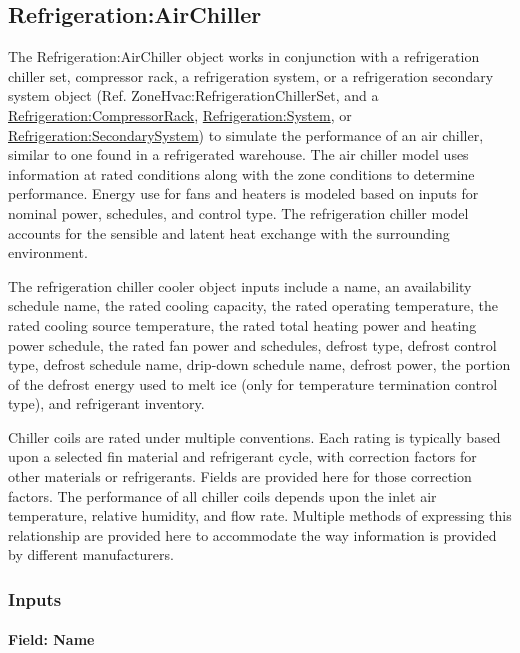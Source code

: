 \subsection{Refrigeration:AirChiller}\label{refrigerationairchiller}

The Refrigeration:AirChiller object works in conjunction with a refrigeration chiller set, compressor rack, a refrigeration system, or a refrigeration secondary system object (Ref. ZoneHvac:RefrigerationChillerSet, and a \hyperref[refrigerationcompressorrack]{Refrigeration:CompressorRack}, \hyperref[refrigerationsystem]{Refrigeration:System}, or \hyperref[refrigerationsecondarysystem]{Refrigeration:SecondarySystem}) to simulate the performance of an air chiller, similar to one found in a refrigerated warehouse. The air chiller model uses information at rated conditions along with the zone conditions to determine performance. Energy use for fans and heaters is modeled based on inputs for nominal power, schedules, and control type. The refrigeration chiller model accounts for the sensible and latent heat exchange with the surrounding environment.

The refrigeration chiller cooler object inputs include a name, an availability schedule name, the rated cooling capacity, the rated operating temperature, the rated cooling source temperature, the rated total heating power and heating power schedule, the rated fan power and schedules, defrost type, defrost control type, defrost schedule name, drip-down schedule name, defrost power, the portion of the defrost energy used to melt ice (only for temperature termination control type), and refrigerant inventory.

Chiller coils are rated under multiple conventions. Each rating is typically based upon a selected fin material and refrigerant cycle, with correction factors for other materials or refrigerants. Fields are provided here for those correction factors. The performance of all chiller coils depends upon the inlet air temperature, relative humidity, and flow rate. Multiple methods of expressing this relationship are provided here to accommodate the way information is provided by different manufacturers.

\subsubsection{Inputs}\label{inputs-15-011}

\paragraph{Field: Name}\label{field-name-16-007}

